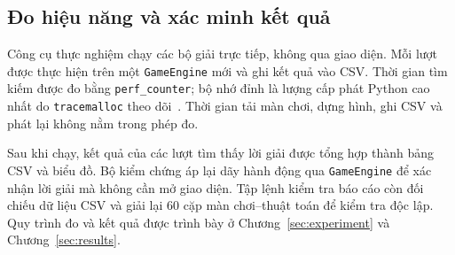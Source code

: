 \subsection{Đo hiệu năng và xác minh kết quả}

Công cụ thực nghiệm chạy các bộ giải trực tiếp, không qua giao diện. Mỗi lượt
được thực hiện trên một \texttt{GameEngine} mới và ghi kết quả vào CSV. Thời gian
tìm kiếm được đo bằng \texttt{perf\_counter}; bộ nhớ đỉnh là lượng cấp phát Python
cao nhất do \texttt{tracemalloc} theo dõi~\cite{python314}. Thời gian tải màn chơi,
dựng hình, ghi CSV và phát lại không nằm trong phép đo.

Sau khi chạy, kết quả của các lượt tìm thấy lời giải được tổng hợp thành bảng
CSV và biểu đồ. Bộ kiểm chứng áp lại dãy hành động qua \texttt{GameEngine} để
xác nhận lời giải mà không cần mở giao diện. Tập lệnh kiểm tra báo cáo còn đối
chiếu dữ liệu CSV và giải lại 60 cặp màn chơi--thuật toán để kiểm tra độc lập.
Quy trình đo và kết quả được trình bày ở Chương~\ref{sec:experiment} và
Chương~\ref{sec:results}.
